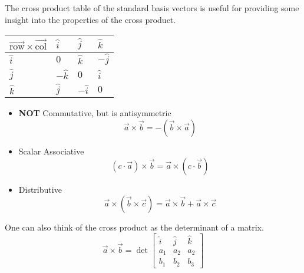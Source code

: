 \noindent
The cross product table of the standard basis vectors is useful for providing some insight into the properties of the cross product.
\begin{table}[h]
	\centering
	\renewcommand{\arraystretch}{1.5}
	\begin{tabular}{|l|l|l|l|}
		\hline
		$\overrightarrow{\text{row}}\times\overrightarrow{\text{col}}$ & $\hat{i}$  & $\hat{j}$  & $\hat{k}$  \\ \hline
		$\hat{i}$                                & $0$        & $\hat{k}$  & $-\hat{j}$ \\ \hline
		$\hat{j}$                                & $-\hat{k}$ & $0$        & $\hat{i}$  \\ \hline
		$\hat{k}$                                & $\hat{j}$  & $-\hat{i}$ & $0$        \\ \hline
	\end{tabular}
\end{table}

\begin{itemize}
	\item \textbf{NOT} Commutative, but is antisymmetric
	\begin{equation*}
		\vec{a}\times\vec{b} = -\left(\vec{b}\times\vec{a}\right)
	\end{equation*}
	\item Scalar Associative
	\begin{equation*}
		\left(c\cdot\vec{a}\right)\times\vec{b}=\vec{a}\times\left(c\cdot\vec{b}\right)
	\end{equation*}
	\item Distributive
	\begin{equation*}
		\vec{a}\times\left(\vec{b}\times\vec{c}\right) = \vec{a}\times\vec{b} + \vec{a}\times\vec{c}
	\end{equation*}
\end{itemize}

\noindent
One can also think of the cross product as the determinant of a matrix.
\begin{equation*}
	\vec{a}\times\vec{b} = \det\begin{bmatrix}
		\hat{i}& \hat{j} & \hat{k} \\
		a_1 & a_2 & a_2\\
		b_1 & b_2 & b_3 
	\end{bmatrix}
\end{equation*}